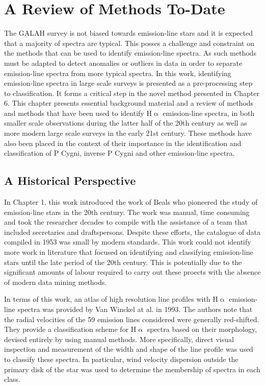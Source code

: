 \chapter{A Review of Methods To-Date}

The GALAH survey is not biased towards emission-line stars and it is expected that a majority of spectra are typical. This posses a challenge and constraint on the methods that can be used to identify emission-line spectra. As such methods must be adapted to detect anomalies or outliers in data in order to separate emission-line spectra from more typical spectra. In this work, identifying emission-line spectra in large scale surveys is presented as a pre-processing step to classification. It forms a critical step in the novel method presented in Chapter 6. This chapter presents essential background material and a review of methods and methods that have been used to identify H$\upalpha$ emission-line spectra, in both smaller scale observations during the latter half of the 20th century as well as more modern large scale surveys in the early 21st century. These methods have also been placed in the context of their importance in the identification and classification of P Cygni, inverse P Cygni and other emission-line spectra.

\section{A Historical Perspective}
In Chapter 1, this work introduced the work of Beals who pioneered the study of emission-line stars in the 20th century. The work was manual, time consuming and took the researcher decades to compile\cite{1953PDAO....9....1B} with the assistance of a team that included secretaries and draftspersons. Despite these efforts, the catalogue of data compiled in 1953 was small by modern standards. This work could not identify more work in literature that focused on identifying and classifying emission-line stars until the late period of the 20th century. This is potentially due to the significant amounts of labour required to carry out these proects with the absence of modern data mining methods. 

In terms of this work, an atlas of high resolution line profiles with H$\upalpha$ emission-line spectra was provided by Van Winckel at al. in 1993\cite{van1993atlas}. The authors note that the radial velocities of the 59 emission lines considered were generally red-shifted. They provide a classification scheme for H$\upalpha$ spectra based on their morphology, devised entirely by using manual methods. More specifically, direct visual inspection and measurement of the width and shape of the line profile was used to classify these spectra. In particular, wind velocity dispersion outside the primary disk of the star was used to determine the membership of spectra in each class.

